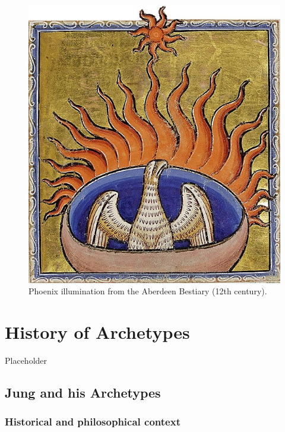 \documentclass[
]{book}
\begin{document}
\begin{figure}

{\centering \includegraphics[width=\textwidth]{img/phoenix_aberdeen_bestiary} 

}

\caption{Phoenix illumination from the Aberdeen Bestiary (12th century).}\label{fig:unnamed-chunk-5}
\end{figure}

\hypertarget{history-of-archetypes}{%
\chapter{History of Archetypes}\label{history-of-archetypes}}

Placeholder

\hypertarget{jung-and-his-archetypes}{%
\section{Jung and his Archetypes}\label{jung-and-his-archetypes}}

\hypertarget{historical-and-philosophical-context}{%
\subsection{Historical and philosophical context}\label{historical-and-philosophical-context}}
\end{document}
